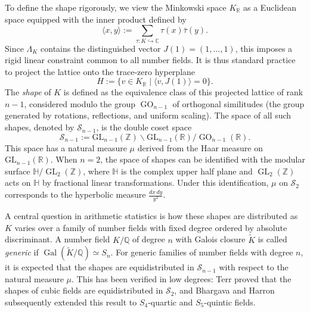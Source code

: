 \documentclass{amsart}
\newcommand{\Q}{\mathbb{Q}}
\newcommand{\op}[1]{\operatorname{#1}}
\newcommand{\R}{\mathbb{R}}
\newcommand{\Z}{\mathbb{Z}}
\newcommand{\GL}{\mathrm{GL}}
\theoremstyle{plain}
\theoremstyle{definition}
\theoremstyle{remark}
\numberwithin{equation}{section}
\begin{document}
To define the shape rigorously, we view the Minkowski space $K_\R$ as a Euclidean space equipped with the inner product defined by \[\langle x, y \rangle:=\sum_{\tau:K\hookrightarrow \mathbb{C}} \tau(x)\bar{\tau} (y).\] Since $\Lambda_K$ contains the distinguished vector $J(1) = (1, \dots, 1)$, this imposes a rigid linear constraint common to all number fields. It is thus standard practice to project the lattice onto the trace-zero hyperplane
\[
H := \{ v \in K_\R \mid \langle v, J(1) \rangle = 0 \}.
\]
The \emph{shape} of $K$ is defined as the equivalence class of this projected lattice of rank $n-1$, considered modulo the group $\op{GO}_{n-1}$ of orthogonal similitudes (the group generated by rotations, reflections, and uniform scaling). The space of all such shapes, denoted by $\mathcal S_{n-1}$, is the double coset space
\[
\mathcal S_{n-1} := \GL_{n-1}(\Z) \backslash \GL_{n-1}(\R) / \op{GO}_{n-1}(\R).
\]
This space has a natural measure $\mu$ derived from the Haar measure on $\GL_{n-1}(\R)$. When $n=2$, the space of shapes can be identified with the modular surface $\mathbb{H}/\op{GL}_2(\mathbb{Z})$, where $\mathbb{H}$ is the complex upper half plane and $\op{GL}_2(\mathbb{Z})$ acts on $\mathbb{H}$ by fractional linear transformations. Under this identification, $\mu$ on $\mathcal{S}_2$ corresponds to the hyperbolic measure $\frac{dx\, dy}{y^2}$.

A central question in arithmetic statistics is how these shapes are distributed as $K$ varies over a family of number fields with fixed degree ordered by absolute discriminant. A number field $K/\mathbb{Q}$ of degree $n$ with Galois closure $\widetilde{K}$ is called \emph{generic} if $\op{Gal}(\widetilde{K}/\Q)\simeq S_n$. For generic families of number fields with degree $n$, it is expected that the shapes are equidistributed in $\mathcal S_{n-1}$ with respect to the natural measure $\mu$. This has been verified in low degrees: Terr \cite{Terr97} proved that the shapes of cubic fields are equidistributed in $\mathcal S_2$, and Bhargava and Harron \cite{BH16} subsequently extended this result to $S_4$-quartic and $S_5$-quintic fields.
\end{document}
